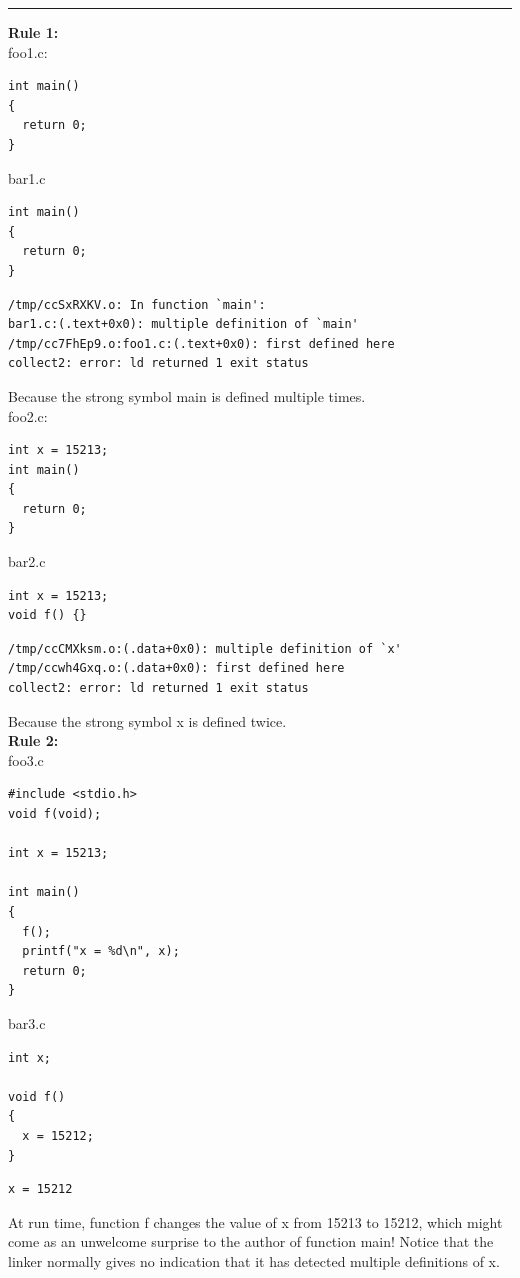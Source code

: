 \documentclass[11pt]{article}
\begin{document}
\noindent\rule{\textwidth}{0.5pt}
\textbf{Rule 1:}\\
foo1.c:\\
\begin{verbatim}
int main()
{
  return 0;
}
\end{verbatim}
bar1.c\\
\begin{verbatim}
int main()
{
  return 0;
}
\end{verbatim}

\begin{verbatim}
/tmp/ccSxRXKV.o: In function `main':
bar1.c:(.text+0x0): multiple definition of `main'
/tmp/cc7FhEp9.o:foo1.c:(.text+0x0): first defined here
collect2: error: ld returned 1 exit status
\end{verbatim}
Because the strong symbol main is defined multiple times.\\

foo2.c:\\
\begin{verbatim}
int x = 15213;
int main()
{
  return 0;
}

\end{verbatim}
bar2.c\\
\begin{verbatim}
int x = 15213;
void f() {}

\end{verbatim}
\begin{verbatim}
/tmp/ccCMXksm.o:(.data+0x0): multiple definition of `x'
/tmp/ccwh4Gxq.o:(.data+0x0): first defined here
collect2: error: ld returned 1 exit status
\end{verbatim}
Because the strong symbol x is defined twice.\\




\textbf{Rule 2:}\\
foo3.c\\
\begin{verbatim}
#include <stdio.h>
void f(void);

int x = 15213;

int main()
{
  f();
  printf("x = %d\n", x);
  return 0;
}

\end{verbatim}

bar3.c\\
\begin{verbatim}
int x;

void f()
{
  x = 15212;
}

\end{verbatim}
\begin{verbatim}
x = 15212
\end{verbatim}
At run time, function f changes the value of x from 15213 to 15212, which might come as an unwelcome surprise to the author of function main! Notice that the linker normally gives no indication that it has detected multiple definitions of x.\\
\end{document}
